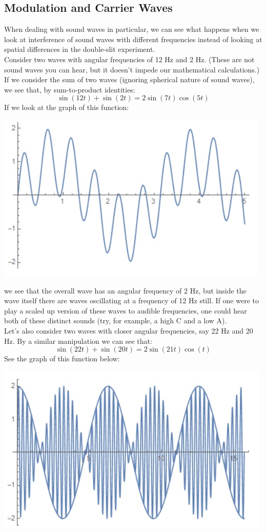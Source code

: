 \subsection{Modulation and Carrier Waves}
When dealing with sound waves in particular, we can see what happens when we look at interference of sound waves with different frequencies instead of looking at spatial differences in the double-slit experiment.\\
Consider two waves with angular frequencies of 12 Hz and 2 Hz. (These are not sound waves you can hear, but it doesn't impede our mathematical calculations.) If we consider the sum of two waves (ignoring spherical nature of sound waves), we see that, by sum-to-product identities:
\[
	\sin(12t) + \sin(2t) = 2\sin(7t)\cos(5t)
\]
If we look at the graph of this function: 
\begin{center}
	\includegraphics[scale=1]{images/waves/modulation1.jpg}\\
\end{center}
we see that the overall wave has an angular frequency of 2 Hz, but inside the wave itself there are waves oscillating at a frequency of 12 Hz still. If one were to play a scaled up version of these waves to audible frequencies, one could hear both of these distinct sounds (try, for example, a high C and a low A). \\
Let's also consider two waves with closer angular frequencies, say 22 Hz and 20 Hz. By a similar manipulation we can see that: 
\[
	\sin(22t) + \sin(20t) = 2\sin(21t)\cos(t)
\]
See the graph of this function below: 
\begin{center}
	\includegraphics[scale=1]{images/waves/modulation2.jpg}\\
\end{center}

